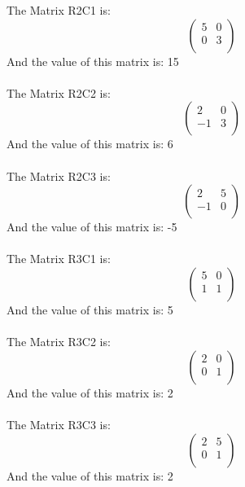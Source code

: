 \documentclass[a4paper,12pt]{article} %
\begin{document}
\noindent
The Matrix R2C1 is:
\[
\begin{pmatrix}
    5 & 0 \\
    0 & 3 \\
\end{pmatrix}
\]
And the value of this matrix is: 15 \\\\

\noindent
The Matrix R2C2 is:
\[
\begin{pmatrix}
    2 & 0 \\
    -1 & 3 \\
\end{pmatrix}
\]
And the value of this matrix is: 6 \\\\

\noindent
The Matrix R2C3 is:
\[
\begin{pmatrix}
    2 & 5 \\
    -1 & 0 \\
\end{pmatrix}
\]
And the value of this matrix is: -5 \\\\

\noindent
The Matrix R3C1 is:
\[
\begin{pmatrix}
    5 & 0 \\
    1 & 1 \\
\end{pmatrix}
\]
And the value of this matrix is: 5 \\\\

\noindent
The Matrix R3C2 is:
\[
\begin{pmatrix}
    2 & 0 \\
    0 & 1 \\
\end{pmatrix}
\]
And the value of this matrix is: 2 \\\\

\noindent
The Matrix R3C3 is:
\[
\begin{pmatrix}
    2 & 5 \\
    0 & 1 \\
\end{pmatrix}
\]
And the value of this matrix is: 2 \\\\
\end{document}

